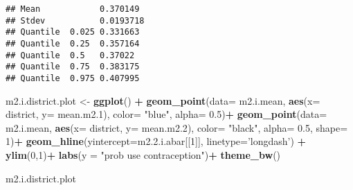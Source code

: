 \documentclass[
]{article}
\newenvironment{Shaded}{\begin{snugshade}}{\end{snugshade}}
\newcommand{\CommentTok}[1]{\textcolor[rgb]{0.56,0.35,0.01}{\textit{#1}}}
\newcommand{\ControlFlowTok}[1]{\textcolor[rgb]{0.13,0.29,0.53}{\textbf{#1}}}
\newcommand{\DataTypeTok}[1]{\textcolor[rgb]{0.13,0.29,0.53}{#1}}
\newcommand{\DecValTok}[1]{\textcolor[rgb]{0.00,0.00,0.81}{#1}}
\newcommand{\FloatTok}[1]{\textcolor[rgb]{0.00,0.00,0.81}{#1}}
\newcommand{\KeywordTok}[1]{\textcolor[rgb]{0.13,0.29,0.53}{\textbf{#1}}}
\newcommand{\NormalTok}[1]{#1}
\newcommand{\OperatorTok}[1]{\textcolor[rgb]{0.81,0.36,0.00}{\textbf{#1}}}
\newcommand{\StringTok}[1]{\textcolor[rgb]{0.31,0.60,0.02}{#1}}
\begin{document}
\begin{Shaded}
\end{Shaded}

\begin{verbatim}
## Mean            0.370149 
## Stdev           0.0193718 
## Quantile  0.025 0.331663 
## Quantile  0.25  0.357164 
## Quantile  0.5   0.37022 
## Quantile  0.75  0.383175 
## Quantile  0.975 0.407995
\end{verbatim}

\begin{Shaded}
\begin{Highlighting}[]
\NormalTok{m2.i.district.plot <-}\StringTok{ }\KeywordTok{ggplot}\NormalTok{() }\OperatorTok{+}
\StringTok{  }\KeywordTok{geom_point}\NormalTok{(}\DataTypeTok{data=}\NormalTok{ m2.i.mean, }\KeywordTok{aes}\NormalTok{(}\DataTypeTok{x=}\NormalTok{ district, }\DataTypeTok{y=}\NormalTok{ mean.m2}\FloatTok{.1}\NormalTok{), }\DataTypeTok{color=} \StringTok{"blue"}\NormalTok{, }\DataTypeTok{alpha=} \FloatTok{0.5}\NormalTok{)}\OperatorTok{+}
\StringTok{  }\KeywordTok{geom_point}\NormalTok{(}\DataTypeTok{data=}\NormalTok{ m2.i.mean, }\KeywordTok{aes}\NormalTok{(}\DataTypeTok{x=}\NormalTok{ district, }\DataTypeTok{y=}\NormalTok{ mean.m2}\FloatTok{.2}\NormalTok{), }\DataTypeTok{color=} \StringTok{"black"}\NormalTok{, }\DataTypeTok{alpha=} \FloatTok{0.5}\NormalTok{, }\DataTypeTok{shape=} \DecValTok{1}\NormalTok{)}\OperatorTok{+}
\StringTok{  }\KeywordTok{geom_hline}\NormalTok{(}\DataTypeTok{yintercept=}\NormalTok{m2.}\FloatTok{2.}\NormalTok{i.abar[[}\DecValTok{1}\NormalTok{]], }\DataTypeTok{linetype=}\StringTok{'longdash'}\NormalTok{) }\OperatorTok{+}
\StringTok{  }\KeywordTok{ylim}\NormalTok{(}\DecValTok{0}\NormalTok{,}\DecValTok{1}\NormalTok{)}\OperatorTok{+}
\StringTok{  }\KeywordTok{labs}\NormalTok{(}\DataTypeTok{y =} \StringTok{"prob use contraception"}\NormalTok{)}\OperatorTok{+}
\StringTok{  }\KeywordTok{theme_bw}\NormalTok{()}
  

\NormalTok{m2.i.district.plot}
\end{Highlighting}
\end{Shaded}
\end{document}
